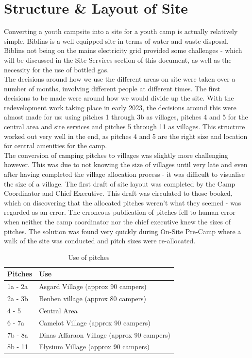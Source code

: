 \chapter{Structure \& Layout of Site}
Converting a youth campsite into a site for a youth camp is actually relatively simple. Biblins is a well equipped site in terms of water and waste disposal. Biblins not being on the mains electricity grid provided some challenges - which will be discussed in the Site Services section of this document, as well as the necessity for the use of bottled gas.\\

The decisions around how we use the different areas on site were taken over a number of months, involving different people at different times. The first decisions to be made were around how we would divide up the site. With the redevelopment work taking place in early 2023, the decisions around this were almost made for us: using pitches 1 through 3b as villages, pitches 4 and 5 for the central area and site services and pitches 5 through 11 as villages. This structure worked out very well in the end, as pitches 4 and 5 are the right size and location for central amenities for the camp.\\

The conversion of camping pitches to villages was slightly more challenging however. This was due to not knowing the size of villages until very late and even after having completed the village allocation process - it was difficult to visualise the size of a village. The first draft of site layout was completed by the Camp Coordinator and Chief Executive. This draft was circulated to those booked, which on discovering that the allocated pitches weren't what they seemed - was regarded as an error. The erroneous publication of pitches fell to human error when neither the camp coordinator nor the chief executive knew the sizes of pitches. The solution was found very quickly during On-Site Pre-Camp where a walk of the site was conducted and pitch sizes were re-allocated.

\begin{table}[ht]
    \centering
    {\RaggedRight
    \begin{tabular}{p{} p{}}
    \textbf{Pitches} & \textbf{Use}\\
    \hline
    \hline
    1a - 2a & Asgard Village (approx 90 campers) \\
    \hline
    2a - 3b & Benben village (approx 80 campers) \\
    \hline
    4 - 5 & Central Area \\
    \hline
    6 - 7a & Camelot Village (approx 90 campers) \\
    \hline
    7b - 8a & Dinas Affaraon Village (approx 90 campers) \\
    \hline
    8b - 11 & Elysium Village (approx 90 campers)\\
    \hline
    \end{tabular}
    } %
    \caption{Use of pitches}
\end{table}


